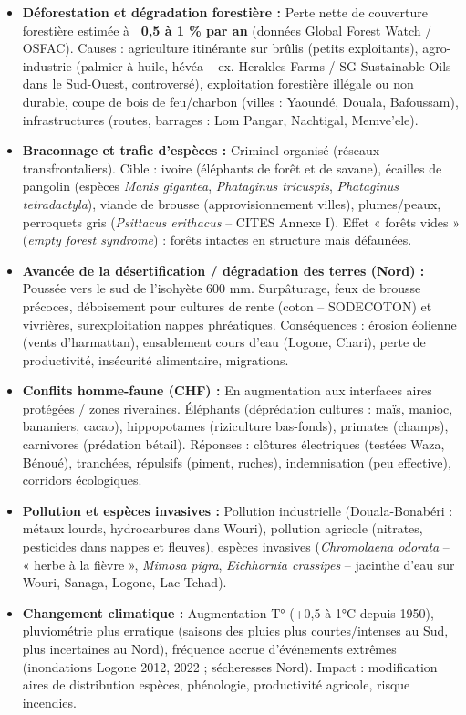 \documentclass[11pt]{article}
\begin{document}
\begin{propriete}
\begin{itemize}
    \item \textbf{Déforestation et dégradation forestière :} Perte nette de couverture forestière estimée à \textbf{~0,5 à 1 \% par an} (données Global Forest Watch / OSFAC). Causes : agriculture itinérante sur brûlis (petits exploitants), agro-industrie (palmier à huile, hévéa -- ex. Herakles Farms / SG Sustainable Oils dans le Sud-Ouest, controversé), exploitation forestière illégale ou non durable, coupe de bois de feu/charbon (villes : Yaoundé, Douala, Bafoussam), infrastructures (routes, barrages : Lom Pangar, Nachtigal, Memve'ele).
    \item \textbf{Braconnage et trafic d'espèces :} Criminel organisé (réseaux transfrontaliers). Cible : ivoire (éléphants de forêt et de savane), écailles de pangolin (espèces \emph{Manis gigantea}, \emph{Phataginus tricuspis}, \emph{Phataginus tetradactyla}), viande de brousse (approvisionnement villes), plumes/peaux, perroquets gris (\emph{Psittacus erithacus} -- CITES Annexe I). Effet « forêts vides » (\emph{empty forest syndrome}) : forêts intactes en structure mais défaunées.
    \item \textbf{Avancée de la désertification / dégradation des terres (Nord) :} Poussée vers le sud de l'isohyète 600 mm. Surpâturage, feux de brousse précoces, déboisement pour cultures de rente (coton -- SODECOTON) et vivrières, surexploitation nappes phréatiques. Conséquences : érosion éolienne (vents d'harmattan), ensablement cours d'eau (Logone, Chari), perte de productivité, insécurité alimentaire, migrations.
    \item \textbf{Conflits homme-faune (CHF) :} En augmentation aux interfaces aires protégées / zones riveraines. Éléphants (déprédation cultures : maïs, manioc, bananiers, cacao), hippopotames (riziculture bas-fonds), primates (champs), carnivores (prédation bétail). Réponses : clôtures électriques (testées Waza, Bénoué), tranchées, répulsifs (piment, ruches), indemnisation (peu effective), corridors écologiques.
    \item \textbf{Pollution et espèces invasives :} Pollution industrielle (Douala-Bonabéri : métaux lourds, hydrocarbures dans Wouri), pollution agricole (nitrates, pesticides dans nappes et fleuves), espèces invasives (\emph{Chromolaena odorata} -- « herbe à la fièvre », \emph{Mimosa pigra}, \emph{Eichhornia crassipes} -- jacinthe d'eau sur Wouri, Sanaga, Logone, Lac Tchad).
    \item \textbf{Changement climatique :} Augmentation T° (+0,5 à 1°C depuis 1950), pluviométrie plus erratique (saisons des pluies plus courtes/intenses au Sud, plus incertaines au Nord), fréquence accrue d'événements extrêmes (inondations Logone 2012, 2022 ; sécheresses Nord). Impact : modification aires de distribution espèces, phénologie, productivité agricole, risque incendies.
\end{itemize}
\end{propriete}
\end{document}
